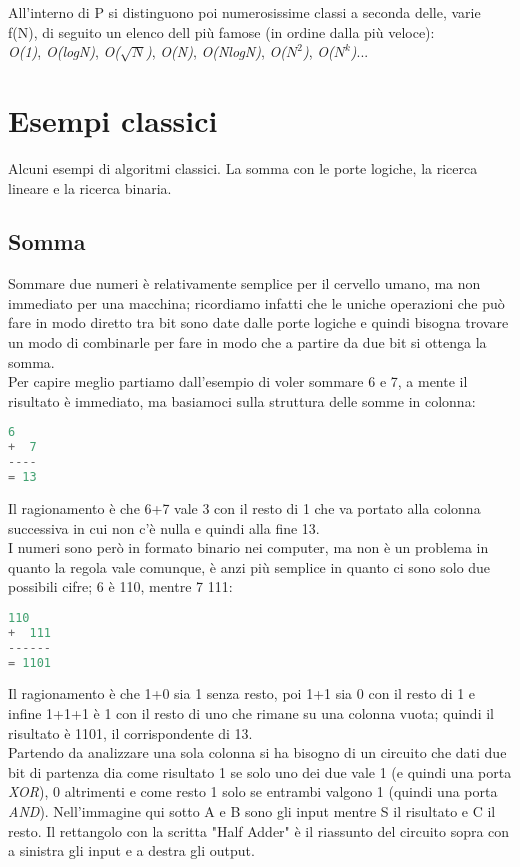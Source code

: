 All'interno di P si distinguono poi numerosissime classi a seconda delle,  varie f(N), di seguito un elenco dell più famose (in ordine dalla più veloce):\\
\textit{O(1)}, \textit{O(logN)}, \textit{O($\sqrt{N}$)}, \textit{O(N)}, \textit{O(NlogN)}, \textit{O($N^2$)}, \textit{O($N^k$)}...
\section{Esempi classici}
Alcuni esempi di algoritmi classici. La somma con le porte logiche, la ricerca lineare e la ricerca binaria.
\subsection{Somma}
Sommare due numeri è relativamente semplice per il cervello umano, ma non immediato per una macchina; ricordiamo infatti che le uniche operazioni che può fare in modo diretto tra bit sono date dalle porte logiche e quindi bisogna trovare un modo di combinarle per fare in modo che a partire da due bit si ottenga la somma.\\
Per capire meglio partiamo dall'esempio di voler sommare 6 e 7, a mente il risultato è immediato, ma basiamoci sulla struttura delle somme in colonna:
\begin{lstlisting}[language=python]
   6
+  7
----
= 13
\end{lstlisting}
Il ragionamento è che 6+7 vale 3 con il resto di 1 che va portato alla colonna successiva in cui non c'è nulla e quindi alla fine 13.\\
I numeri sono però in formato binario nei computer, ma non è un problema in quanto la regola vale comunque, è anzi più semplice in quanto ci sono solo due possibili cifre; 6 è 110, mentre 7 111:
\begin{lstlisting}[language=python]
   110
+  111
------
= 1101
\end{lstlisting}
Il ragionamento è che 1+0 sia 1 senza resto, poi 1+1 sia 0 con il resto di 1 e infine 1+1+1 è 1 con il resto di uno che rimane su una colonna vuota; quindi il risultato è 1101, il corrispondente di 13.\\
Partendo da analizzare una sola colonna si ha bisogno di un circuito che dati due bit di partenza dia come risultato 1 se solo uno dei due vale 1 (e quindi una porta \textit{XOR}), 0 altrimenti e come resto 1 solo se entrambi valgono 1 (quindi una porta \textit{AND}). Nell'immagine qui sotto A e B sono gli input mentre S il risultato e C il resto. Il rettangolo con la scritta "Half Adder" è il riassunto del circuito sopra con a sinistra gli input e a destra gli output.
